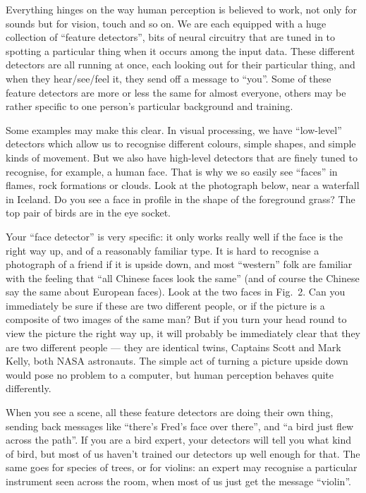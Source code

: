   Everything hinges on the way human perception is believed to work, not only 
  for sounds but for vision, touch and so on. We are each equipped with a huge 
  collection of ``feature detectors'', bits of neural circuitry that are tuned 
  in to spotting a particular thing when it occurs among the input data. These 
  different detectors are all running at once, each looking out for their 
  particular thing, and when they hear/see/feel it, they send off a message to 
  ``you''. Some of these feature detectors are more or less the same for almost 
  everyone, others may be rather specific to one person's particular background 
  and training. 

  Some examples may make this clear. In visual processing, we have 
  ``low-level'' detectors which allow us to recognise different colours, simple 
  shapes, and simple kinds of movement. But we also have high-level detectors 
  that are finely tuned to recognise, for example, a human face. That is why we 
  so easily see ``faces'' in flames, rock formations or clouds. Look at the 
  photograph below, near a waterfall in Iceland. Do you see a face in profile 
  in the shape of the foreground grass? The top pair of birds are in the eye 
  socket. 


  Your ``face detector'' is very specific: it only works really well if the 
  face is the right way up, and of a reasonably familiar type. It is hard to 
  recognise a photograph of a friend if it is upside down, and most ``western'' 
  folk are familiar with the feeling that ``all Chinese faces look the same'' 
  (and of course the Chinese say the same about European faces). Look at the 
  two faces in Fig.\ 2. Can you immediately be sure if these are two different 
  people, or if the picture is a composite of two images of the same man? But 
  if you turn your head round to view the picture the right way up, it will 
  probably be immediately clear that they are two different people --- they are 
  identical twins, Captains Scott and Mark Kelly, both NASA astronauts. The 
  simple act of turning a picture upside down would pose no problem to a 
  computer, but human perception behaves quite differently. 


  When you see a scene, all these feature detectors are doing their own thing, 
  sending back messages like ``there's Fred's face over there'', and ``a bird 
  just flew across the path''. If you are a bird expert, your detectors will 
  tell you what kind of bird, but most of us haven't trained our detectors up 
  well enough for that. The same goes for species of trees, or for violins: an 
  expert may recognise a particular instrument seen across the room, when most 
  of us just get the message ``violin''. 

